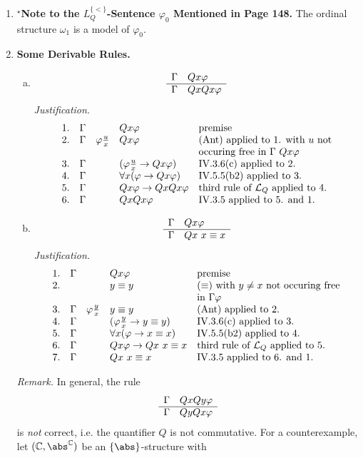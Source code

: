 \begin{enumerate}[1.]
\begin{enumerate}[(1)]
\end{enumerate}
%
\item $^\star$\textbf{Note to the $L_Q^{ \{ < \} }$-Sentence $\varphi_0$ Mentioned in Page 148.} The ordinal structure $\omega_1$ is a model of $\varphi_0$.
%
\item \textbf{Some Derivable Rules.}
\begin{enumerate}[(a)]
\item
\[
\begin{array}{ll}
\Gamma & Qx\varphi \cr\hline
\Gamma & QxQx \varphi
\end{array}
\]
\textit{Justification.}
\[
\begin{array}{lllll}
1. & \Gamma & \ & Qx\varphi & \mbox{premise} \cr
2. & \Gamma & \varphi\frac{u}{x} & Qx\varphi & \mbox{(Ant) applied to 1. with $u$ not} \cr
\ & \ & \ & \ & \mbox{occuring free in $\Gamma \ Qx\varphi$} \cr
3. & \Gamma & \ & (\varphi\frac{u}{x} \rightarrow Qx\varphi) & \mbox{IV.3.6(c) applied to 2.} \cr
4. & \Gamma & \ & \forall x (\varphi \to Qx\varphi) & \mbox{IV.5.5(b2) applied to 3.} \cr
5. & \Gamma & \ & Qx\varphi \rightarrow QxQx\varphi & \mbox{third rule of $\mathcal{L}_Q$ applied to 4.} \cr
6. & \Gamma & \ & QxQx\varphi & \mbox{IV.3.5 applied to 5. and 1.}
\end{array}
\]
\item
\[
\begin{array}{ll}
\Gamma & Qx\varphi \cr\hline
\Gamma & Qx \ x \equiv x
\end{array}
\]
\textit{Justification.}
\[
\begin{array}{lllll}
1. & \Gamma & \ & Qx\varphi & \mbox{premise} \cr
2. & \ & \ & y \equiv y & \mbox{($\equiv$) with $y \neq x$ not occuring free} \cr
\  & \ & \ & \ & \mbox{in $\Gamma\varphi$} \cr
3. & \Gamma & \varphi\frac{y}{x} & y \equiv y & \mbox{(Ant) applied to 2.} \cr
4. & \Gamma & \ & (\varphi\frac{y}{x} \rightarrow y \equiv y) & \mbox{IV.3.6(c) applied to 3.} \cr
5. & \Gamma & \ & \forall x (\varphi \rightarrow x \equiv x) & \mbox{IV.5.5(b2) applied to 4.} \cr
6. & \Gamma & \ & Qx\varphi \rightarrow Qx \ x \equiv x & \mbox{third rule of $\mathcal{L}_Q$ applied to 5.} \cr
7. & \Gamma & \ & Qx \ x \equiv x & \mbox{IV.3.5 applied to 6. and 1.}
\end{array}
\]
\end{enumerate}
\textit{Remark.} In general, the rule
\[
\begin{array}{ll}
\Gamma & QxQy\varphi \cr\hline
\Gamma & QyQx\varphi
\end{array}
\]
is \emph{not} correct, i.e. the quantifier $Q$ is not commutative. For a counterexample, let $(\mathbb{C}, \abs^\mathbb{C})$ be an $\{ \abs \}$-structure with

\end{enumerate}
